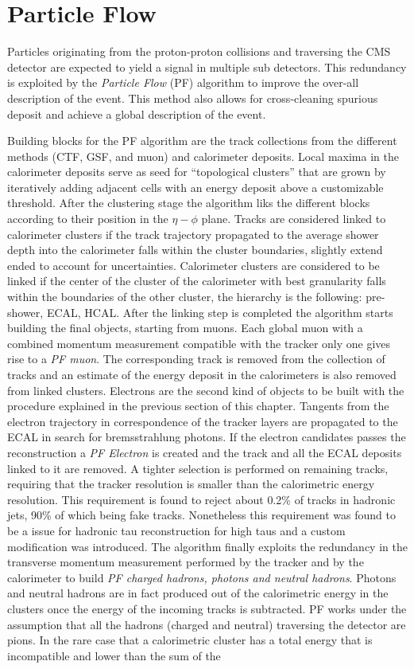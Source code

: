 \section{Particle Flow}


Particles originating from the proton-proton collisions and traversing the CMS detector are expected to yield a signal in multiple sub detectors. This redundancy is exploited by the \emph{Particle Flow} (PF) algorithm to improve the over-all description of the event. This method also allows for cross-cleaning spurious deposit and achieve a global description of the event.

Building blocks for the PF algorithm are the track collections from the different methods (CTF, GSF, and muon) and calorimeter deposits. Local maxima in the calorimeter deposits serve as seed for ``topological clusters'' that are grown by iteratively adding adjacent cells with an energy deposit above a customizable threshold. After the clustering stage the algorithm liks the different blocks according to their position in the $\eta-\phi$ plane. Tracks are considered linked to calorimeter clusters if the track trajectory propagated to the average shower depth into the calorimeter falls within the cluster boundaries, slightly extend ended to account for uncertainties. Calorimeter clusters are considered to be linked if the center of the cluster of the calorimeter with best granularity falls within the boundaries of the other cluster, the hierarchy is the following: pre-shower, ECAL, HCAL. After the linking step is completed the algorithm starts building the final objects, starting from muons. Each global muon with a combined momentum measurement compatible with the tracker only one gives rise to a \emph{PF muon}. The corresponding track is removed from the collection of tracks and an estimate of the energy deposit in the calorimeters is also removed from linked clusters. Electrons are the second kind of objects to be built with the procedure explained in the previous section of this chapter. Tangents from the electron trajectory in correspondence of the tracker layers are propagated to the ECAL in search for bremsstrahlung photons. If the electron candidates passes the reconstruction a \emph{PF Electron} is created and the track and all the ECAL deposits linked to it are removed. A tighter selection is performed on remaining tracks, requiring that the tracker \pT resolution is smaller than the calorimetric energy resolution. This requirement is found to reject about 0.2\% of tracks in hadronic jets, 90\% of which being fake tracks. Nonetheless this requirement was found to be a issue for hadronic tau reconstruction for high \pT taus and a custom modification was introduced. The algorithm finally exploits the redundancy in the transverse momentum measurement performed by the tracker and by the calorimeter to build \emph{PF charged hadrons, photons and neutral hadrons}. Photons and neutral hadrons are in fact produced out of the calorimetric energy in the clusters once the energy of the incoming tracks is subtracted. PF works under the assumption that all the hadrons (charged and neutral) traversing the detector are pions. In the rare case that a calorimetric cluster has a total energy that is incompatible and lower than the sum of the 